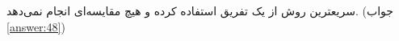 \section{}
\paragraph{}\label{hint:216}
سریعترین روش از یک تفریق استفاده کرده و هیچ مقایسه‌ای انجام نمی‌دهد. (جواب \ref{answer:48})
